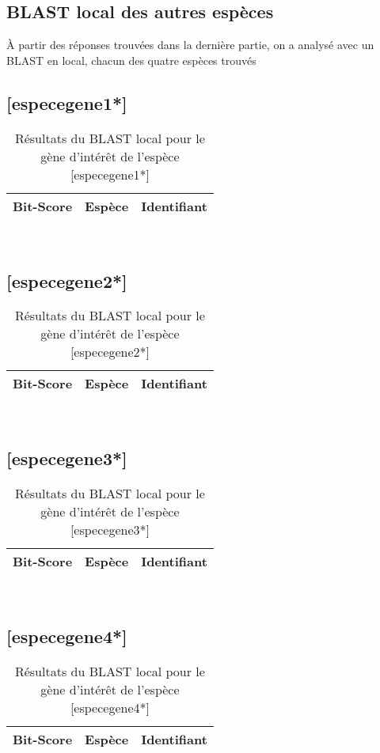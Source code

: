 \documentclass[a4paper]{article}
\begin{document}
\begin{multicols}{2}
\section{BLAST local des autres espèces}
À partir des réponses trouvées dans la dernière partie, on a analysé avec un BLAST en local, chacun des quatre espèces trouvés

\subsection{[especegene1*]}
\begin{table}[H]
\small\sf\centering
\caption{Résultats du BLAST local pour le gène d'intérêt de l'espèce [especegene1*]}
\begin{tabular}{lll}
\toprule
Bit-Score&Espèce&Identifiant\\
\midrule
[Tableaugene1*]
\bottomrule
\end{tabular}\\[10pt]
\end{table}

\subsection{[especegene2*]}
\begin{table}[H]
\small\sf\centering
\caption{Résultats du BLAST local pour le gène d'intérêt de l'espèce [especegene2*]}
\begin{tabular}{lll}
\toprule
Bit-Score&Espèce&Identifiant\\
\midrule
[Tableaugene2*]
\bottomrule
\end{tabular}\\[10pt]
\end{table}

\subsection{[especegene3*]}
\begin{table}[H]
\small\sf\centering
\caption{Résultats du BLAST local pour le gène d'intérêt de l'espèce [especegene3*]}
\begin{tabular}{lll}
\toprule
Bit-Score&Espèce&Identifiant\\
\midrule
[Tableaugene3*]
\bottomrule
\end{tabular}\\[10pt]
\end{table}

\subsection{[especegene4*]}
\begin{table}[H]
\small\sf\centering
\caption{Résultats du BLAST local pour le gène d'intérêt de l'espèce [especegene4*]}
\begin{tabular}{lll}
\toprule
Bit-Score&Espèce&Identifiant\\
\midrule
[Tableaugene4*]
\bottomrule
\end{tabular}\\[10pt]
\end{table}

\end{multicols}
\end{document}
